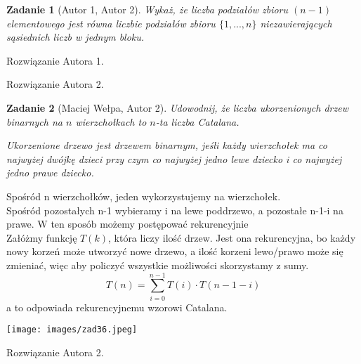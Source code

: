 \documentclass{mwart}
\newtheorem{zad}{Zadanie}[section]
\begin{document}
\begin{zad}[Autor 1, Autor 2]
    Wykaż, że liczba podziałów zbioru $(n - 1)$  elementowego jest równa
    liczbie podziałów zbioru $\{1, ..., n\}$ niezawierających sąsiednich liczb w jednym bloku.
\end{zad}
\begin{mdframed}
    Rozwiązanie Autora 1.
\end{mdframed}
\begin{mdframed}
    Rozwiązanie Autora 2.
\end{mdframed}




\begin{zad}[Maciej Wełpa, Autor 2]
    Udowodnij, że liczba ukorzenionych drzew binarnych na $n$ wierzchołkach to $n$-ta liczba Catalana.

    Ukorzenione drzewo jest drzewem binarnym, jeśli każdy wierzchołek ma co najwyżej
    dwójkę dzieci przy czym co najwyżej jedno lewe dziecko i co najwyżej jedno prawe dziecko.
\end{zad}
\begin{mdframed}
    Spośród n wierzchołków, jeden wykorzystujemy na wierzchołek.\\
    Spośród pozostałych n-1 wybieramy i na lewe poddrzewo, a pozostałe n-1-i na prawe. W ten sposób możemy postępować rekurencyjnie\\
    Załóżmy funkcję \( T(k) \), która liczy ilość drzew. Jest ona rekurencyjna, bo każdy nowy korzeń może utworzyć nowe drzewo, a ilość korzeni lewo/prawo może się zmieniać, więc aby policzyć wszystkie możliwości skorzystamy z sumy.
    \[
    T(n) = \sum_{i=0}^{n-1} T(i) \cdot T(n-1-i)
    \]
    a to odpowiada rekurencyjnemu wzorowi Catalana.
    \begin{center}
    \texttt{[image: images/zad36.jpeg]}
\end{center}

\end{mdframed}
\begin{mdframed}
    Rozwiązanie Autora 2.
\end{mdframed}
\end{document}
